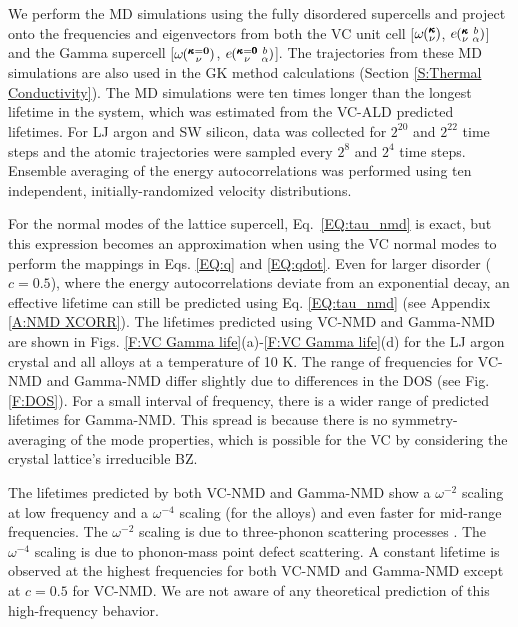 \documentclass[12pt,twocolumn,iop]{/usr/share/texmf/tex/latex/iop/iopart}[/usr/share/texmf/tex/latex/iop/]
\newcommand{\kvba}{\mspace{-4.0mu}\left(\mspace{-8.0mu}
\begin{smallmatrix} &\pmb{\kappa} &b \\ &\nu &\alpha\end{smallmatrix}
\mspace{-3.0mu}\right)}
\newcommand{\kgvba}{\mspace{-4.0mu}\left(\mspace{-8.0mu}
\begin{smallmatrix} &\pmb{\kappa}=\pmb{0} &b \\ &\nu 
&\alpha\end{smallmatrix}\mspace{-3.0mu}\right)}
\newcommand{\kv}{\mspace{-4.0mu}\left(\mspace{-8.0mu}
\begin{smallmatrix}&\pmb{\kappa} \\&\nu\end{smallmatrix}
\mspace{-3.0mu}\right)}
\newcommand{\kgv}{\mspace{-4.0mu}\left(\mspace{-8.0mu}
\begin{smallmatrix}&\pmb{\kappa}=\mathbf{0} \\&\nu\end{smallmatrix}
\mspace{-3.0mu}\right)}
\begin{document}
We perform the MD simulations using the fully disordered supercells  
and project onto the frequencies and eigenvectors 
from both the VC unit cell [$\omega\kv$, $e\kvba$] and the 
Gamma supercell [$\omega\kgv$, $e\kgvba$]. 
The trajectories from 
these MD simulations are also used in the GK method calculations
(Section \ref{S:Thermal Conductivity}). 
The MD simulations were ten times longer than the 
longest lifetime in the system, which was  
estimated from the VC-ALD predicted lifetimes. For LJ 
argon and SW silicon, data was collected for $2^{20}$ and 
$2^{22}$ time steps and the atomic trajectories were sampled 
every $2^8$ and $2^4$ time steps. 
Ensemble averaging of the energy autocorrelations was performed 
using ten independent, initially-randomized velocity distributions. 

For the normal modes of the lattice supercell, 
Eq.~\eqref{EQ:tau_nmd} is exact, but this expression becomes an 
approximation when 
using the VC normal modes to perform the mappings in Eqs.  
\eqref{EQ:q} and \eqref{EQ:qdot}. 
Even for larger disorder ($c=0.5$),  
where the energy autocorrelations 
deviate from an exponential decay, 
an effective lifetime can still be predicted 
using Eq. \eqref{EQ:tau_nmd} (see Appendix \ref{A:NMD XCORR}). 
The lifetimes predicted using VC-NMD and Gamma-NMD  
are shown in Figs. \ref{F:VC Gamma life}(a)-\ref{F:VC Gamma life}(d) 
for the LJ argon crystal and all alloys at a temperature of 10 K. 
The range of frequencies for 
VC-NMD and Gamma-NMD differ slightly due to differences in 
the DOS (see Fig. \ref{F:DOS}). 
For a small interval of frequency, there is a wider range of 
predicted lifetimes for Gamma-NMD. This spread is because there 
is no symmetry-averaging of the mode properties, 
which is possible for the VC by considering the crystal 
lattice's irreducible BZ.\cite{ashcroft_solid_1976} 

The lifetimes predicted by both VC-NMD and Gamma-NMD 
show a $\omega^{-2}$ scaling at low frequency and a $\omega^{-4}$ 
scaling (for the alloys) and 
even faster for mid-range frequencies. The $\omega^{-2}$ scaling 
is due to three-phonon scattering processes
\cite{callaway_model_1959,maradudin_scattering_1962}. The 
$\omega^{-4}$ scaling is due to phonon-mass point defect 
scattering.\cite{klemens_scattering_1955,klemens_thermal_1957,mattis_phonon_1957,tamura_isotope_1983} 
A constant lifetime is observed at the highest frequencies  
for both VC-NMD and Gamma-NMD except at $c=0.5$ for VC-NMD. We are not 
aware of any theoretical prediction of this high-frequency behavior.
\end{document}
